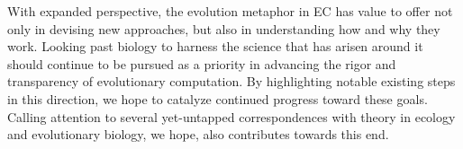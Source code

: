 With expanded perspective, the evolution metaphor in EC has value to offer not only in devising new approaches, but also in understanding how and why they work.
Looking past biology to harness the science that has arisen around it should continue to be pursued as a priority in advancing the rigor and transparency of evolutionary computation.
By highlighting notable existing steps in this direction, we hope to catalyze continued progress toward these goals.
Calling attention to several yet-untapped correspondences with theory in ecology and evolutionary biology, we hope, also contributes towards this end.
